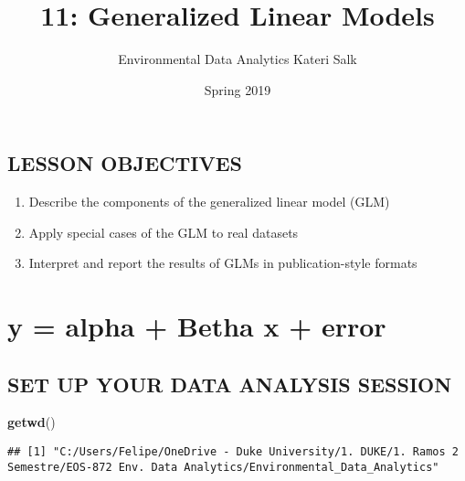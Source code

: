 \documentclass[]{article}
\title{11: Generalized Linear Models}
\author{Environmental Data Analytics \textbar{} Kateri Salk}
\date{Spring 2019}
\newenvironment{Shaded}{\begin{snugshade}}{\end{snugshade}}
\newcommand{\KeywordTok}[1]{\textcolor[rgb]{0.13,0.29,0.53}{\textbf{#1}}}
\newcommand{\NormalTok}[1]{#1}
\providecommand{\tightlist}{%
  \setlength{\itemsep}{0pt}\setlength{\parskip}{0pt}}
\begin{document}
\maketitle

\subsection{LESSON OBJECTIVES}\label{lesson-objectives}

\begin{enumerate}
\def\labelenumi{\arabic{enumi}.}
\tightlist
\item
  Describe the components of the generalized linear model (GLM)
\item
  Apply special cases of the GLM to real datasets
\item
  Interpret and report the results of GLMs in publication-style formats
\end{enumerate}

\section{y = alpha + Betha x + error}\label{y-alpha-betha-x-error}

\subsection{SET UP YOUR DATA ANALYSIS
SESSION}\label{set-up-your-data-analysis-session}

\begin{Shaded}
\begin{Highlighting}[]
\KeywordTok{getwd}\NormalTok{()}
\end{Highlighting}
\end{Shaded}

\begin{verbatim}
## [1] "C:/Users/Felipe/OneDrive - Duke University/1. DUKE/1. Ramos 2 Semestre/EOS-872 Env. Data Analytics/Environmental_Data_Analytics"
\end{verbatim}
\end{document}
